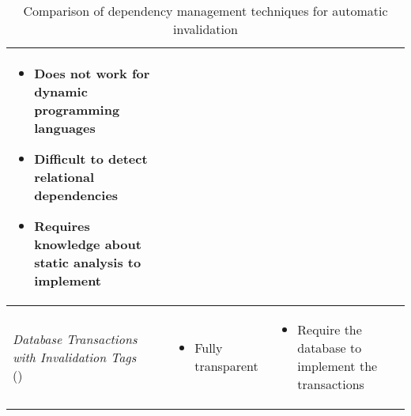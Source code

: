 \begin{table}[ht!]
\begin{tabular}{lll}
{{\begin{itemize}[leftmargin=0.75em]
          \item Does not work for dynamic programming languages
          \item Difficult to detect relational dependencies
          \item Requires knowledge about static analysis to implement
        \end{itemize}
      }
    } \\
    \hline
    {
      \parbox{3.5cm}{
        \emph{Database Transactions with Invalidation Tags} \\ (\cite{paper:liskov})
      }
    } & {
      \parbox{3.5cm}{
        \begin{itemize}[leftmargin=0.75em]
          \item Fully transparent
        \end{itemize}
      }
    } & {
      \parbox{3.5cm}{
        \begin{itemize}[leftmargin=0.75em]
          \item Require the database to implement the transactions
        \end{itemize}
      }
    } \\
    \hline
  \end{tabular}
  \caption{Comparison of dependency management techniques for automatic invalidation}
  \label{fig:dependency-management-comparison}
\end{table}





